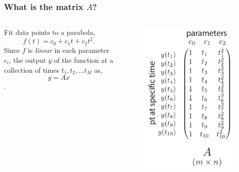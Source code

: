 \documentclass[xcolor={dvipsnames}]{beamer}
\begin{document}
\begin{frame}
\frametitle{What is the matrix $A$?}
\begin{columns}
Fit data points to a parabola,
$$f(t) = c_0 + c_1 t + c_2 t^2.$$
Since $f$ is \emph{linear} in each parameter $c_i$,
the output $y$ of the function at a collection of times $t_1, t_2, \ldots t_M$ as,
$$y = A x$$.
\pause
{}
\vspace{-0.5in}
\begin{figure}
\includegraphics[height=0.86\textheight]{figs/A.pdf}
\end{figure}
\end{columns}
\end{frame}
\end{document}
